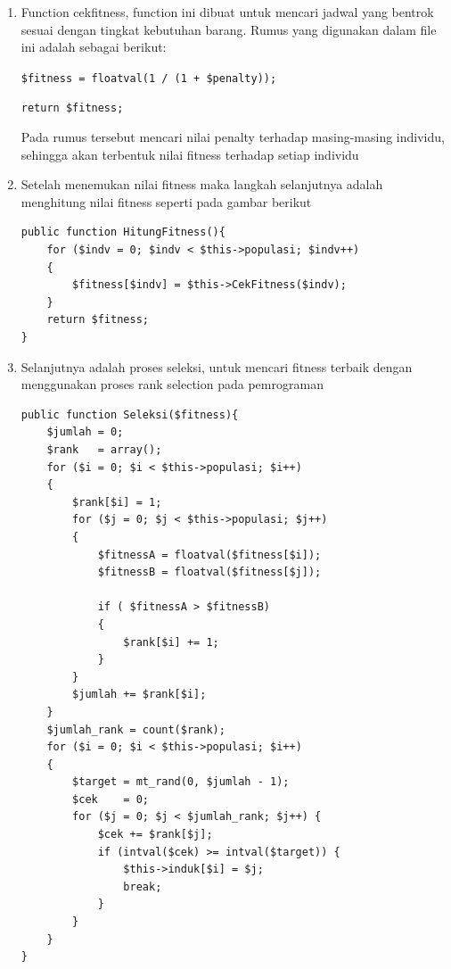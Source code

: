 \begin{enumerate}
\begin{enumerate}
	\item Function cekfitness, function ini dibuat untuk mencari jadwal yang bentrok sesuai dengan tingkat kebutuhan barang. Rumus yang digunakan dalam file ini adalah sebagai berikut:
	\par \verb|$fitness = floatval(1 / (1 + $penalty));|
	\par \verb|return $fitness;|
	\par Pada rumus tersebut mencari nilai penalty terhadap masing-masing individu, sehingga akan terbentuk nilai fitness terhadap setiap individu
	
	\item Setelah menemukan nilai fitness maka langkah selanjutnya adalah menghitung nilai fitness seperti pada gambar berikut
\begin{lstlisting}
public function HitungFitness(){        
    for ($indv = 0; $indv < $this->populasi; $indv++)
    {            
        $fitness[$indv] = $this->CekFitness($indv);            
    }
    return $fitness;
}
\end{lstlisting}
		
	\item Selanjutnya adalah proses seleksi, untuk mencari fitness terbaik dengan menggunakan proses rank selection pada pemrograman
\begin{lstlisting}
public function Seleksi($fitness){
    $jumlah = 0;
    $rank   = array();
    for ($i = 0; $i < $this->populasi; $i++)
    {
        $rank[$i] = 1;
        for ($j = 0; $j < $this->populasi; $j++)
        {
            $fitnessA = floatval($fitness[$i]);
            $fitnessB = floatval($fitness[$j]);
            
            if ( $fitnessA > $fitnessB)
            {
                $rank[$i] += 1;                    
            }
        }
        $jumlah += $rank[$i];
    }
    $jumlah_rank = count($rank);
    for ($i = 0; $i < $this->populasi; $i++)
    {
        $target = mt_rand(0, $jumlah - 1);           
        $cek    = 0;
        for ($j = 0; $j < $jumlah_rank; $j++) {
            $cek += $rank[$j];
            if (intval($cek) >= intval($target)) {
                $this->induk[$i] = $j;
                break;
            }
        }
    }
}
\end{lstlisting}
		

\end{enumerate}
\end{enumerate}
